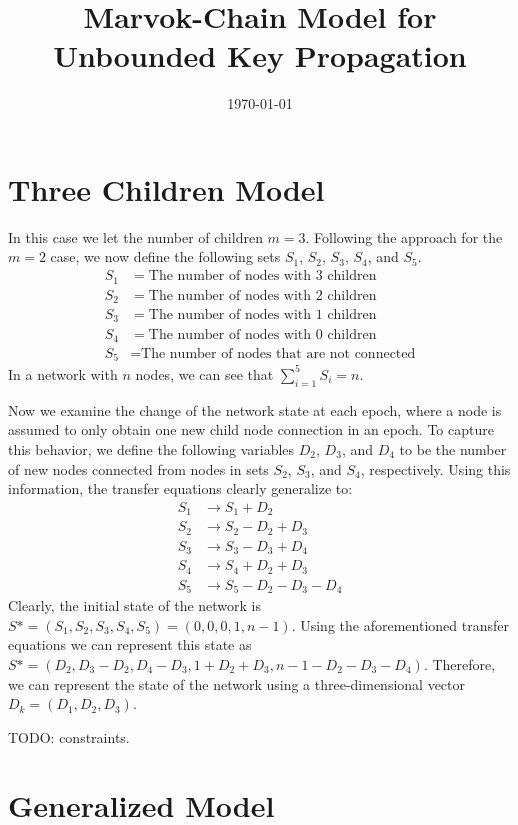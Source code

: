 \documentclass[a4paper,10pt]{article}
\title{Marvok-Chain Model for Unbounded Key Propagation}
\author{}
\date{\today}
\begin{document}
\maketitle

\section{Three Children Model}
In this case we let the number of children $m = 3$. Following the approach for the 
$m = 2$ case, we now define the following sets $S_1$, $S_2$, $S_3$, $S_4$, and $S_5$.
\begin{align*}
S_1 & = \text{The number of nodes with $3$ children} \\
S_2 & = \text{The number of nodes with $2$ children} \\
S_3 & = \text{The number of nodes with $1$ children} \\
S_4 & = \text{The number of nodes with $0$ children} \\
S_5 & = \text{The number of nodes that are not connected}
\end{align*}
In a network with $n$ nodes, we can see that $\sum_{i = 1}^{5}S_i = n$. 

Now we examine the change of the network state at each epoch, where a node is
assumed to only obtain one new child node connection in an epoch. To capture this
behavior, we define the following variables $D_2$, $D_3$, and $D_4$ to be the
number of new nodes connected from nodes in sets $S_2$, $S_3$, and $S_4$, respectively. 
Using this information, the transfer equations clearly generalize to:
\begin{align*}
S_1 & \rightarrow S_1 + D_2 \\
S_2 & \rightarrow S_2 - D_2 + D_3 \\
S_3 & \rightarrow S_3 - D_3 + D_4 \\
S_4 & \rightarrow S_4 + D_2 + D_3 \\
S_5 & \rightarrow S_5 - D_2 - D_3 - D_4
\end{align*}
Clearly, the initial state of the network is $S* = (S_1, S_2, S_3, S_4, S_5) = (0, 0, 0, 1, n - 1)$.
Using the aforementioned transfer equations we can represent this state as 
$S* = (D_2, D_3 - D_2, D_4 - D_3, 1 + D_2 + D_3, n - 1 - D_2 - D_3 - D_4)$. 
Therefore, we can represent the state of the network using a three-dimensional vector
$D_k = (D_1, D_2, D_3)$. 

TODO: constraints.

\section{Generalized Model}


\begin{comment}
\begin{figure}[h]
\begin{center}$
\begin{array}{cc}
\texttt{[image: images\_p2/f49.eps]} &
\texttt{[image: images\_p2/f50.eps]}
\end{array}$
\end{center}
\end{figure}
\end{comment}


\end{document}
